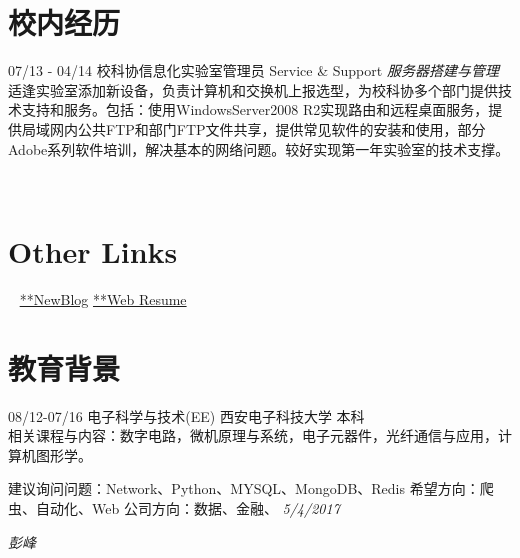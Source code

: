 \documentclass[]{friggeri-cv}
\begin{document}
\section{校内经历}
\begin{entrylist}
  \entry
    {07/13 - 04/14}
    {校科协信息化实验室管理员}
    {Service \& Support}
    {\emph{服务器搭建与管理}
    适逢实验室添加新设备，负责计算机和交换机上报选型，为校科协多个部门提供技术支持和服务。包括：使用WindowsServer2008 R2实现路由和远程桌面服务，提供局域网内公共FTP和部门FTP文件共享，提供常见软件的安装和使用，部分Adobe系列软件培训，解决基本的网络问题。较好实现第一年实验室的技术支撑。  \\     
    }
    
\end{entrylist}






\begin{aside}
~
~ 
  ~    
  \section{Other Links}
    ~
    {\href{https://blog.mxuan.me}{**NewBlog}}
    {\href{https://resume.mxuan.me}{**Web Resume}}
   ~
   ~
\end{aside}




\section{教育背景}
08/12\hspace{1mm}-\hspace{1mm}07/16 \hspace{27mm} 电子科学与技术(EE) \hspace{7mm}  西安电子科技大学  \hspace{7mm}  本科 \\

相关课程与内容：数字电路，微机原理与系统，电子元器件，光纤通信与应用，计算机图形学。\\

\begin{flushleft}
建议询问问题：Network、Python、MYSQL、MongoDB、Redis
希望方向：爬虫、自动化、Web
公司方向：数据、金融、
\emph{5/4/2017}
\end{flushleft}
\begin{flushright}
\emph{彭峰}
\end{flushright}
\end{document}
